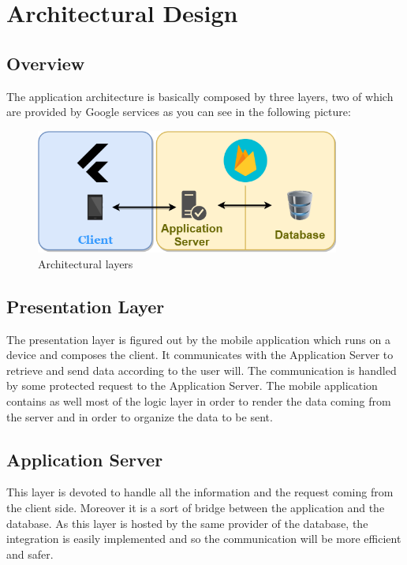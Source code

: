 \chapter{Architectural Design}

\section{Overview}
	The application architecture is basically composed by three layers, two of which are provided by Google services as you can see in the following picture:

	\begin{figure}[H]
		\begin{center}
			\includegraphics[width=10cm]{img/CookingTime_Architecture.png}
			\caption{Architectural layers}
			\label{Fig:ArchitecturalLayers}
		\end{center}
	\end{figure}

\section{Presentation Layer}
	The presentation layer is figured out by the mobile application which runs on a device and composes the client. 
	It communicates with the Application Server to retrieve and send data according to the user will. 
	The communication is handled by some protected request to the Application Server. 
	The mobile application contains as well most of the logic layer in order to render the data coming from the server and in order to organize the data to be sent.

\section{Application Server}
	This layer is devoted to handle all the information and the request coming from the client side. 
	Moreover it is a sort of bridge between the application and the database. 
	As this layer is hosted by the same provider of the database, the integration is easily implemented and so the communication will be more efficient and safer.

